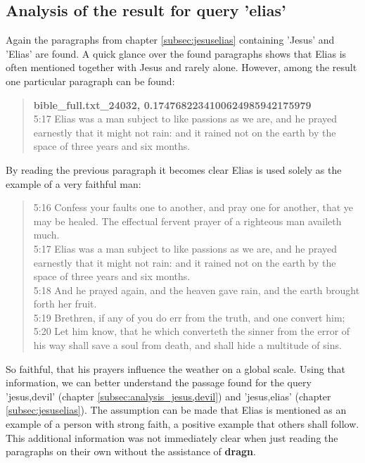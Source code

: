 \subsection{Analysis of the result for query 'elias'}
Again the paragraphs from chapter \ref{subsec:jesuselias} containing 'Jesus' and 'Elias' are found. A quick glance over the found paragraphs shows that Elias is often mentioned together with Jesus and rarely alone. However, among the result one particular paragraph can be found:
\blockquote{
\textbf{bible\_full.txt\_24032, 0.1747682234100624985942175979}\\
5:17 Elias was a man subject to like passions as we are, and he prayed earnestly that it might not rain: and it rained not on the earth by the space of three years and six months.}
By reading the previous paragraph it becomes clear Elias is used solely as the example of a very faithful man:

\blockquote{
5:16 Confess your faults one to another, and pray one for another, that ye may be healed. The effectual fervent prayer of a righteous man availeth much.\\
5:17 Elias was a man subject to like passions as we are, and he prayed earnestly that it might not rain: and it rained not on the earth by the space of three years and six months.\\
5:18 And he prayed again, and the heaven gave rain, and the earth brought forth her fruit.\\
5:19 Brethren, if any of you do err from the truth, and one convert him; 5:20 Let him know, that he which converteth the sinner from the error of his way shall save a soul from death, and shall hide a multitude of sins.
}
So faithful, that his prayers influence the weather on a global scale. Using that information, we can better understand the passage found for the query 'jesus,devil' (chapter \ref{subsec:analysis_jesus,devil}) and 'jesus,elias' (chapter \ref{subsec:jesuselias}). The assumption can be made that Elias is mentioned as an example of a person with strong faith, a positive example that others shall follow. This additional information was not immediately clear when just reading the paragraphs on their own without the assistance of \textbf{dragn}.

